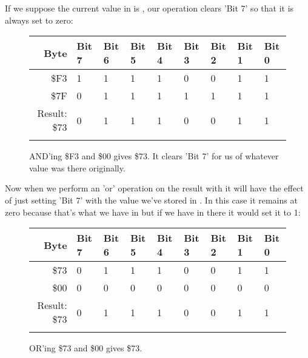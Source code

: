 If we suppose the current value in  is , our  operation clears 'Bit 7' so that
it is always set to zero:

\begin{figure}[H]
  {
    \setlength{\tabcolsep}{3.0pt}
    \setlength\cmidrulewidth{\heavyrulewidth} %
    \begin{adjustbox}{width=10cm,center}

      \begin{tabular}{rllllllll}
        \toprule
        Byte & Bit 7 & Bit 6 & Bit 5 & Bit 4 & Bit 3 & Bit 2 & Bit 1 & Bit 0        \\
        \midrule
        \$F3 & 1 & 1 & 1 & 1 & 0 & 0 & 1 & 1 \\
        \$7F & 0 & 1 & 1 & 1 & 1 & 1 & 1 & 1 \\
        \midrule
        Result: \$73 & 0 & 1 & 1 & 1 & 0 & 0 & 1 & 1 \\
        \addlinespace
        \bottomrule
      \end{tabular}
    \end{adjustbox}
  }\caption*{AND'ing \$F3 and \$00 gives \$73. It clears 'Bit 7' for us of whatever value was there originally.}
\end{figure}

Now when we perform an 'or' operation on the result with  it will have the effect of just setting 'Bit 7'
with the value we've stored in . In this case it remains at zero because that's what we have in
 but if we have  in there it would set it to 1: 

\begin{figure}[H]
  {
    \setlength{\tabcolsep}{3.0pt}
    \setlength\cmidrulewidth{\heavyrulewidth} %
    \begin{adjustbox}{width=10cm,center}

      \begin{tabular}{rllllllll}
        \toprule
        Byte & Bit 7 & Bit 6 & Bit 5 & Bit 4 & Bit 3 & Bit 2 & Bit 1 & Bit 0        \\
        \midrule
        \$73 & 0 & 1 & 1 & 1 & 0 & 0 & 1 & 1 \\
        \$00 & 0 & 0 & 0 & 0 & 0 & 0 & 0 & 0 \\
        \midrule
        Result: \$73 & 0 & 1 & 1 & 1 & 0 & 0 & 1 & 1 \\
        \addlinespace
        \bottomrule
      \end{tabular}
    \end{adjustbox}
  }\caption*{OR'ing \$73 and \$00 gives \$73.}
\end{figure}

